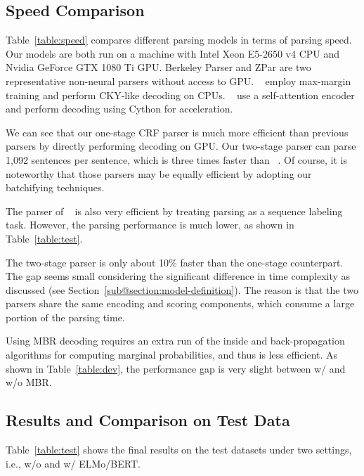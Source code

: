 \documentclass{article}
\begin{document}
%
 \subsection{Speed Comparison}
Table~\ref{table:speed} compares different parsing models in terms of parsing speed.
Our models are both run on a machine with Intel Xeon E5-2650 v4 CPU and Nvidia GeForce GTX 1080 Ti GPU.
Berkeley Parser and ZPar are two representative non-neural parsers without access to GPU.
\citeauthor{stern-etal-2017-minimal}~ employ max-margin training and perform CKY-like decoding on CPUs.
\citeauthor{kitaev-klein-2018-constituency}~ use a self-attention encoder and perform decoding using Cython for acceleration.


We can see that our one-stage CRF parser is much more efficient than previous parsers by directly performing decoding on GPU.
Our two-stage parser can parse 1,092 sentences per sentence, which is three times faster than \citeauthor{kitaev-klein-2018-constituency}~.
Of course, it is noteworthy that those parsers \cite{stern-etal-2017-minimal,kitaev-klein-2018-constituency} may be equally efficient by adopting our batchifying techniques.

The parser of \citeauthor{gomez-rodriguez-vilares-2018-constituent}~ is also very efficient by treating parsing as a sequence labeling task. However, the parsing performance is much lower, as shown in Table~\ref{table:test}.

The two-stage parser is only about 10\% faster than the one-stage counterpart. The gap seems small considering the significant difference in time complexity as discussed (see Section~\ref{sub@section:model-definition}).
The reason is that the two parsers share the same encoding and scoring components, which consume a large portion of the parsing time.

Using MBR decoding requires an extra run of the inside and back-propagation algorithms for computing marginal probabilities, and thus is less efficient.
As shown in Table~\ref{table:dev}, the performance gap is very slight between w/ and w/o MBR.



%
 \subsection{Results and Comparison on Test Data}
Table~\ref{table:test} shows the final results on the test datasets under two settings, i.e., w/o and w/ ELMo/BERT.
\end{document}
